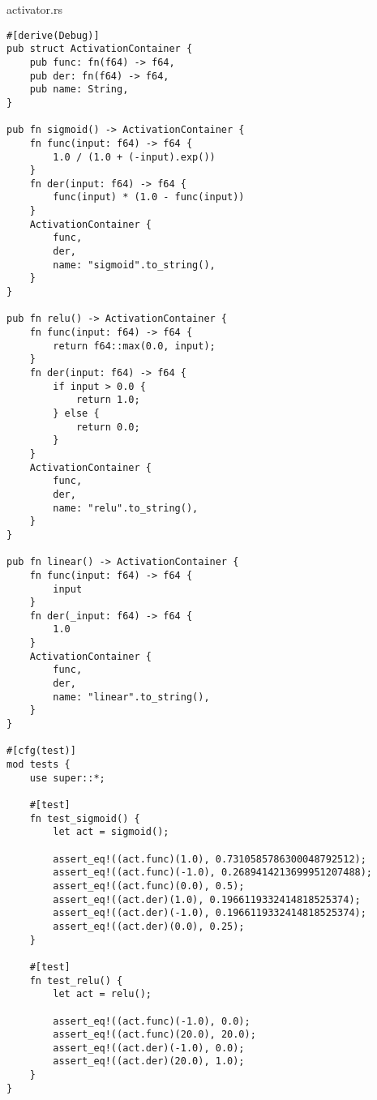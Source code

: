 \begin{code}
\caption{activator.rs}
\begin{verbatim}  
#[derive(Debug)]
pub struct ActivationContainer {
    pub func: fn(f64) -> f64,
    pub der: fn(f64) -> f64,
    pub name: String,
}

pub fn sigmoid() -> ActivationContainer {
    fn func(input: f64) -> f64 {
        1.0 / (1.0 + (-input).exp())
    }
    fn der(input: f64) -> f64 {
        func(input) * (1.0 - func(input))
    }
    ActivationContainer {
        func,
        der,
        name: "sigmoid".to_string(),
    }
}

pub fn relu() -> ActivationContainer {
    fn func(input: f64) -> f64 {
        return f64::max(0.0, input);
    }
    fn der(input: f64) -> f64 {
        if input > 0.0 {
            return 1.0;
        } else {
            return 0.0;
        }
    }
    ActivationContainer {
        func,
        der,
        name: "relu".to_string(),
    }
}

pub fn linear() -> ActivationContainer {
    fn func(input: f64) -> f64 {
        input
    }
    fn der(_input: f64) -> f64 {
        1.0
    }
    ActivationContainer {
        func,
        der,
        name: "linear".to_string(),
    }
}

#[cfg(test)]
mod tests {
    use super::*;

    #[test]
    fn test_sigmoid() {
        let act = sigmoid();

        assert_eq!((act.func)(1.0), 0.7310585786300048792512);
        assert_eq!((act.func)(-1.0), 0.2689414213699951207488);
        assert_eq!((act.func)(0.0), 0.5);
        assert_eq!((act.der)(1.0), 0.1966119332414818525374);
        assert_eq!((act.der)(-1.0), 0.1966119332414818525374);
        assert_eq!((act.der)(0.0), 0.25);
    }

    #[test]
    fn test_relu() {
        let act = relu();

        assert_eq!((act.func)(-1.0), 0.0);
        assert_eq!((act.func)(20.0), 20.0);
        assert_eq!((act.der)(-1.0), 0.0);
        assert_eq!((act.der)(20.0), 1.0);
    }
}

\end{verbatim}
\end{code}

